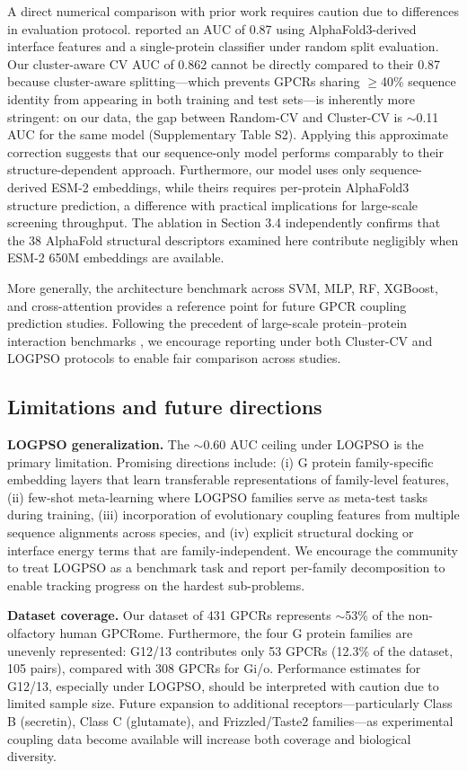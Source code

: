 \documentclass[11pt,a4paper]{article}
\begin{document}
A direct numerical comparison with prior work requires caution due to differences in evaluation protocol. \cite{miglionico2025predicting} reported an AUC of 0.87 using AlphaFold3-derived interface features and a single-protein classifier under random split evaluation. Our cluster-aware CV AUC of 0.862 cannot be directly compared to their 0.87 because cluster-aware splitting—which prevents GPCRs sharing $\ge$40\% sequence identity from appearing in both training and test sets—is inherently more stringent: on our data, the gap between Random-CV and Cluster-CV is $\sim$0.11 AUC for the same model (Supplementary Table S2). Applying this approximate correction suggests that our sequence-only model performs comparably to their structure-dependent approach. Furthermore, our model uses only sequence-derived ESM-2 embeddings, while theirs requires per-protein AlphaFold3 structure prediction, a difference with practical implications for large-scale screening throughput. The ablation in Section 3.4 independently confirms that the 38 AlphaFold structural descriptors examined here contribute negligibly when ESM-2 650M embeddings are available.

More generally, the architecture benchmark across SVM, MLP, RF, XGBoost, and cross-attention provides a reference point for future GPCR coupling prediction studies. Following the precedent of large-scale protein--protein interaction benchmarks \cite{reim2025large}, we encourage reporting under both Cluster-CV and LOGPSO protocols to enable fair comparison across studies.

\subsection{Limitations and future directions}

\textbf{LOGPSO generalization.} The $\sim$0.60 AUC ceiling under LOGPSO is the primary limitation. Promising directions include: (i) G protein family-specific embedding layers that learn transferable representations of family-level features, (ii) few-shot meta-learning where LOGPSO families serve as meta-test tasks during training, (iii) incorporation of evolutionary coupling features from multiple sequence alignments across species, and (iv) explicit structural docking or interface energy terms that are family-independent. We encourage the community to treat LOGPSO as a benchmark task and report per-family decomposition to enable tracking progress on the hardest sub-problems.

\textbf{Dataset coverage.} Our dataset of 431 GPCRs represents $\sim$53\% of the non-olfactory human GPCRome. Furthermore, the four G protein families are unevenly represented: G12/13 contributes only 53 GPCRs (12.3\% of the dataset, 105 pairs), compared with 308 GPCRs for Gi/o. Performance estimates for G12/13, especially under LOGPSO, should be interpreted with caution due to limited sample size. Future expansion to additional receptors---particularly Class B (secretin), Class C (glutamate), and Frizzled/Taste2 families---as experimental coupling data become available will increase both coverage and biological diversity.
\end{document}
